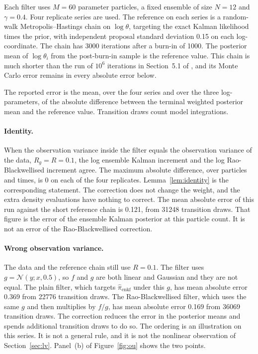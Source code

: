 Each filter uses \(M = 60\) parameter particles, a fixed ensemble of size \(N = 12\) and \(\gamma = 0.4\). Four replicate series are used. The reference on each series is a random-walk Metropolis--Hastings chain on \(\log\theta\), targeting the exact Kalman likelihood times the prior, with independent proposal standard deviation 0.15 on each log-coordinate. The chain has 3000 iterations after a burn-in of 1000. The posterior mean of \(\log\theta_i\) from the post-burn-in sample is the reference value. This chain is much shorter than the run of \(10^{6}\) iterations in Section~5.1 of \citet{golightly2026}, and its Monte Carlo error remains in every absolute error below.

The reported error is the mean, over the four series and over the three log-parameters, of the absolute difference between the terminal weighted posterior mean and the reference value. Transition draws count model integrations.

\paragraph{Identity.}
When the observation variance inside the filter equals the observation variance of the data, \(R_g = R = 0.1\), the log ensemble Kalman increment and the log Rao-Blackwellised increment agree. The maximum absolute difference, over particles and times, is 0 on each of the four replicates. Lemma~\ref{lem:identity} is the corresponding statement. The correction does not change the weight, and the extra density evaluations have nothing to correct. The mean absolute error of this run against the short reference chain is 0.121, from 31248 transition draws. That figure is the error of the ensemble Kalman posterior at this particle count. It is not an error of the Rao-Blackwellised correction.

\paragraph{Wrong observation variance.}
The data and the reference chain still use \(R = 0.1\). The filter uses \(g = \mathcal{N}(y; x, 0.5)\), so \(f\) and \(g\) are both linear and Gaussian and they are not equal. The plain filter, which targets \(\hat{\pi}_{\mathrm{enkf}}\) under this \(g\), has mean absolute error 0.369 from 22776 transition draws. The Rao-Blackwellised filter, which uses the same \(g\) and then multiplies by \(f/g\), has mean absolute error 0.169 from 36069 transition draws. The correction reduces the error in the posterior means and spends additional transition draws to do so. The ordering is an illustration on this series. It is not a general rule, and it is not the nonlinear observation of Section~\ref{sec:lv}. Panel~(b) of Figure~\ref{fig:ou} shows the two points.


